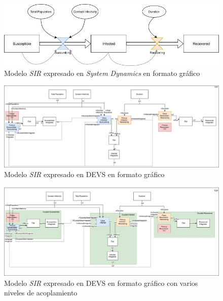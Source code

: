 \begin{figure}[!h]
\centering
\includegraphics[scale=0.5]{imagenes/SIR_sd.jpg}
\caption{Modelo \textit{SIR} expresado en \textit{System Dynamics} en formato gráfico}
\label{fig:SIR_sd}
\end{figure}
\begin{figure}[!h]
\centering
\includegraphics[scale=0.3]{imagenes/SIR_devs_flattened.jpg}
\caption{Modelo \textit{SIR} expresado en DEVS en formato gráfico}
\label{fig:SIR_devs_flattened}
\end{figure}
\begin{figure}[!h]
\centering
\includegraphics[scale=0.3]{imagenes/SIR_devs.jpg}
\caption{Modelo \textit{SIR} expresado en DEVS en formato gráfico con varios niveles de acoplamiento}
\label{fig:SIR_devs}
\end{figure}


